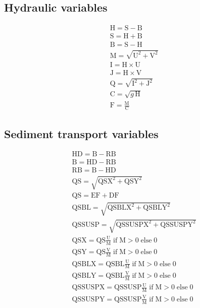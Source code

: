 \documentclass{article}
\newcommand{\B}{\mathrm{B}}
\newcommand{\HAU}{\mathrm{H}}
\newcommand{\SL}{\mathrm{S}}
\newcommand{\U}{\mathrm{U}}
\newcommand{\V}{\mathrm{V}}
\newcommand{\M}{\mathrm{M}}
\newcommand{\I}{\mathrm{I}}
\newcommand{\J}{\mathrm{J}}
\newcommand{\HD}{\mathrm{HD}}
\newcommand{\RB}{\mathrm{RB}}
\newcommand{\EF}{\mathrm{EF}}
\newcommand{\DF}{\mathrm{DF}}
\newcommand{\QS}{\mathrm{QS}}
\newcommand{\QSX}{\mathrm{QSX}}
\newcommand{\QSY}{\mathrm{QSY}}
\newcommand{\QSBL}{\mathrm{QSBL}}
\newcommand{\QSBLX}{\mathrm{QSBLX}}
\newcommand{\QSBLY}{\mathrm{QSBLY}}
\newcommand{\QSSUSP}{\mathrm{QSSUSP}}
\newcommand{\QSSUSPX}{\mathrm{QSSUSPX}}
\newcommand{\QSSUSPY}{\mathrm{QSSUSPY}}
\newcommand{\IF}{\mathrm{if}\;}
\newcommand{\ELSE}{\mathrm{else}\;}
\begin{document}
\begin{multicols}{2}

\subsection{Hydraulic variables}
\[\begin{aligned}
& \HAU = \SL - \B\\
& \SL = \HAU + \B\\
& \B = \SL - \HAU\\
& \M = \sqrt{\U^2+\V^2}\\
& \I = \HAU \times \U\\
& \J = \HAU \times \V\\
& \mathrm{Q} = \sqrt{\I^2 + \J^2}\\
& \mathrm{C} = \sqrt{g\,\HAU}\\
& \mathrm{F} = \frac{\M}{\mathrm{C}}
\end{aligned}\]

\vspace{1cm}                    %

\subsection{Sediment transport variables}
\[\begin{aligned}
& \HD = \B - \RB\\
& \B = \HD - \RB\\
& \RB = \B - \HD\\
& \QS = \sqrt{\QSX ^2 + \QSY ^2}\\
& \QS = \EF + \DF\\
& \QSBL = \sqrt{\QSBLX ^2 + \QSBLY ^2}\\
& \QSSUSP = \sqrt{\QSSUSPX ^2 + \QSSUSPY ^2}\\
& \QSX = \QS \frac{\U}{\M} \;\IF \M > 0 \;\ELSE 0\\
& \QSY = \QS \frac{\V}{\M} \;\IF \M > 0 \;\ELSE 0\\
& \QSBLX = \QSBL \frac{\U}{\M} \;\IF \M > 0 \;\ELSE 0\\
& \QSBLY = \QSBL \frac{\V}{\M} \;\IF \M > 0 \;\ELSE 0\\
& \QSSUSPX = \QSSUSP \frac{\U}{\M} \;\IF \M > 0 \;\ELSE 0\\
& \QSSUSPY = \QSSUSP \frac{\V}{\M} \;\IF \M > 0 \;\ELSE 0
\end{aligned}\]

\end{multicols}
\end{document}
